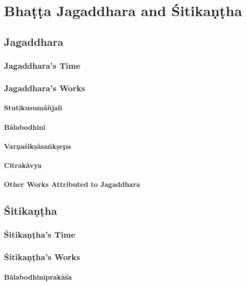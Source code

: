 \chapter{Bhaṭṭa Jagaddhara and Śitikaṇṭha}

\section{Jagaddhara}

\subsection{Jagaddhara's Time}

\subsection{Jagaddhara's Works}

\subsubsection{Stutikusumāñjali}

\subsubsection{Bālabodhinī}

\subsubsection{Varṇaśikṣāsaṅkṣepa}

\subsubsection{Citrakāvya}

\subsubsection{Other Works Attributed to Jagaddhara}

\section{Śitikaṇṭha}

\subsection{Śitikaṇṭha's Time}
	
\subsection{Śitikaṇṭha's Works}

\subsubsection{Bālabodhinīprakāśa}

